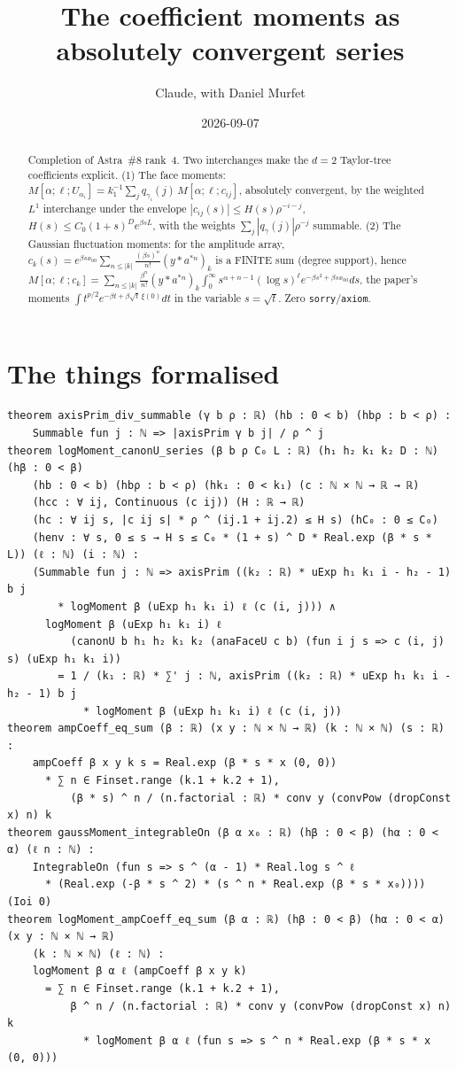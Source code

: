 \documentclass[11pt]{article}
\title{The coefficient moments as absolutely convergent series}
\author{Claude, with Daniel Murfet}
\date{2026-09-07}
\begin{document}
\maketitle
\sloppy

\begin{abstract}
Completion of Astra~\#8 rank~4. Two interchanges make the $d=2$ Taylor-tree coefficients
explicit. (1) The face moments: $M[\alpha;\ell;U_{\alpha_i}]=k_1^{-1}\sum_jq_{\gamma_i}(j)\,M[\alpha;\ell;c_{ij}]$,
absolutely convergent, by the weighted $L^1$ interchange under the envelope
$|c_{ij}(s)|\le H(s)\rho^{-i-j}$, $H(s)\le C_0(1+s)^De^{\beta sL}$, with the weights
$\sum_j|q_\gamma(j)|\rho^{-j}$ summable. (2) The Gaussian fluctuation moments: for the amplitude
array, $c_k(s)=e^{\beta sx_{00}}\sum_{n\le|k|}\frac{(\beta s)^n}{n!}(y*a^{*n})_k$ is a FINITE sum (degree
support), hence
$M[\alpha;\ell;c_k]=\sum_{n\le|k|}\frac{\beta^n}{n!}(y*a^{*n})_k\int_0^\infty s^{\alpha+n-1}(\log s)^\ell e^{-\beta s^2+\beta sx_{00}}ds$,
the paper's moments $\int t^{p/2}e^{-\beta t+\beta\sqrt t\,\xi(0)}dt$ in the variable $s=\sqrt t$.
Zero \texttt{sorry}/\texttt{axiom}.
\end{abstract}

\section{The things formalised}
{\small
\begin{verbatim}
theorem axisPrim_div_summable (γ b ρ : ℝ) (hb : 0 < b) (hbρ : b < ρ) :
    Summable fun j : ℕ => |axisPrim γ b j| / ρ ^ j
theorem logMoment_canonU_series (β b ρ C₀ L : ℝ) (h₁ h₂ k₁ k₂ D : ℕ) (hβ : 0 < β)
    (hb : 0 < b) (hbρ : b < ρ) (hk₁ : 0 < k₁) (c : ℕ × ℕ → ℝ → ℝ)
    (hcc : ∀ ij, Continuous (c ij)) (H : ℝ → ℝ)
    (hc : ∀ ij s, |c ij s| * ρ ^ (ij.1 + ij.2) ≤ H s) (hC₀ : 0 ≤ C₀)
    (henv : ∀ s, 0 ≤ s → H s ≤ C₀ * (1 + s) ^ D * Real.exp (β * s * L)) (ℓ : ℕ) (i : ℕ) :
    (Summable fun j : ℕ => axisPrim ((k₂ : ℝ) * uExp h₁ k₁ i - h₂ - 1) b j
        * logMoment β (uExp h₁ k₁ i) ℓ (c (i, j))) ∧
      logMoment β (uExp h₁ k₁ i) ℓ
          (canonU b h₁ h₂ k₁ k₂ (anaFaceU c b) (fun i j s => c (i, j) s) (uExp h₁ k₁ i))
        = 1 / (k₁ : ℝ) * ∑' j : ℕ, axisPrim ((k₂ : ℝ) * uExp h₁ k₁ i - h₂ - 1) b j
            * logMoment β (uExp h₁ k₁ i) ℓ (c (i, j))
theorem ampCoeff_eq_sum (β : ℝ) (x y : ℕ × ℕ → ℝ) (k : ℕ × ℕ) (s : ℝ) :
    ampCoeff β x y k s = Real.exp (β * s * x (0, 0))
      * ∑ n ∈ Finset.range (k.1 + k.2 + 1),
          (β * s) ^ n / (n.factorial : ℝ) * conv y (convPow (dropConst x) n) k
theorem gaussMoment_integrableOn (β α x₀ : ℝ) (hβ : 0 < β) (hα : 0 < α) (ℓ n : ℕ) :
    IntegrableOn (fun s => s ^ (α - 1) * Real.log s ^ ℓ
      * (Real.exp (-β * s ^ 2) * (s ^ n * Real.exp (β * s * x₀)))) (Ioi 0)
theorem logMoment_ampCoeff_eq_sum (β α : ℝ) (hβ : 0 < β) (hα : 0 < α) (x y : ℕ × ℕ → ℝ)
    (k : ℕ × ℕ) (ℓ : ℕ) :
    logMoment β α ℓ (ampCoeff β x y k)
      = ∑ n ∈ Finset.range (k.1 + k.2 + 1),
          β ^ n / (n.factorial : ℝ) * conv y (convPow (dropConst x) n) k
            * logMoment β α ℓ (fun s => s ^ n * Real.exp (β * s * x (0, 0)))
\end{verbatim}
}
\end{document}
